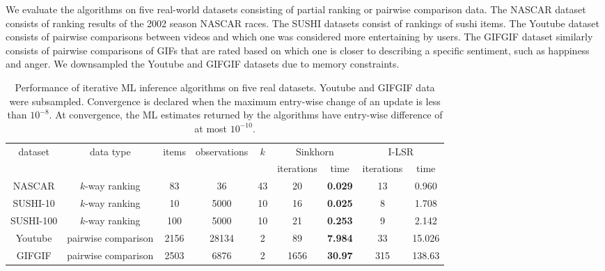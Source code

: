 We evaluate the algorithms on five real-world datasets consisting
of partial ranking or pairwise comparison data. The NASCAR dataset
consists of ranking results of the 2002 season NASCAR races. The SUSHI
datasets consist of rankings of sushi items. The Youtube dataset consists
of pairwise comparisons between videos and which one was considered
more entertaining by users. The GIFGIF dataset similarly consists
of pairwise comparisons of GIFs that are rated based on which one
is closer to describing a specific sentiment, such as happiness and
anger. We downsampled the Youtube and GIFGIF datasets due to memory
constraints. 
\begin{table*}[t]
\begin{centering}
\hspace*{-3cm}%
\begin{tabular}{|c|c|c|c|c|c|c|c|c|}
\hline 
\multirow{2}{*}{dataset} & \multirow{2}{*}{data type} & \multirow{2}{*}{items} & \multirow{2}{*}{observations} & \multirow{2}{*}{$k$} & \multicolumn{2}{c|}{Sinkhorn} & \multicolumn{2}{c|}{I-LSR}\tabularnewline
\cline{6-9} \cline{7-9} \cline{8-9} \cline{9-9} 
 &  &  &  &  & iterations & time & iterations & time\tabularnewline
\hline 
\hline 
NASCAR & $k$-way ranking & 83 & 36 & 43 & 20 & \textbf{0.029} & 13 & 0.960\tabularnewline
\hline 
SUSHI-10 & $k$-way ranking & 10 & 5000 & 10 & 16 & \textbf{0.025} & 8 & 1.708\tabularnewline
\hline 
SUSHI-100 & $k$-way ranking & 100 & 5000 & 10 & 21 & \textbf{0.253} & 9 & 2.142\tabularnewline
\hline 
Youtube & pairwise comparison & 2156 & 28134 & 2 & 89 & \textbf{7.984} & 33 & 15.026\tabularnewline
\hline 
GIFGIF & pairwise comparison & 2503 & 6876 & 2 & 1656 & \textbf{30.97} & 315 & 138.63\tabularnewline
\hline 
\end{tabular}\hspace*{-3cm}
\par\end{centering}
\caption{Performance of iterative ML inference algorithms on five real datasets. Youtube and GIFGIF data were subsampled. 
Convergence is declared when the maximum entry-wise change of an update
is less than $10^{-8}$. At convergence, the ML estimates returned
by the algorithms have entry-wise difference of at most $10^{-10}$.}
\label{tab:empirical}
\end{table*}

